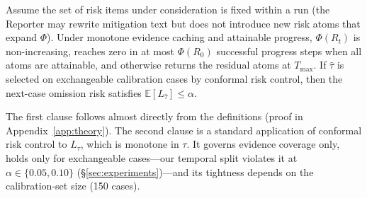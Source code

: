 \begin{observation}
\label{obs:stop}
Assume the set of risk items under consideration is fixed within a run (the Reporter may rewrite mitigation text but does not introduce new risk atoms that expand $\Phi$).
Under monotone evidence caching and attainable progress, $\Phi(R_t)$ is non-increasing, reaches zero in at most $\Phi(R_0)$ successful progress steps when all atoms are attainable, and otherwise returns the residual atoms at $T_{\max}$.
If $\hat{\tau}$ is selected on exchangeable calibration cases by conformal risk control, then the next-case omission risk satisfies $\mathbb{E}[L_{\hat{\tau}}] \le \alpha$.
\end{observation}

The first clause follows almost directly from the definitions (proof in Appendix~\ref{app:theory}).
The second clause is a standard application of conformal risk control \citep{angelopoulos2023conformalrisk} to $L_\tau$, which is monotone in $\tau$.
It governs evidence coverage only, holds only for exchangeable cases---our temporal split violates it at $\alpha \in \{0.05, 0.10\}$ (\S\ref{sec:experiments})---and its tightness depends on the calibration-set size (150 cases).
